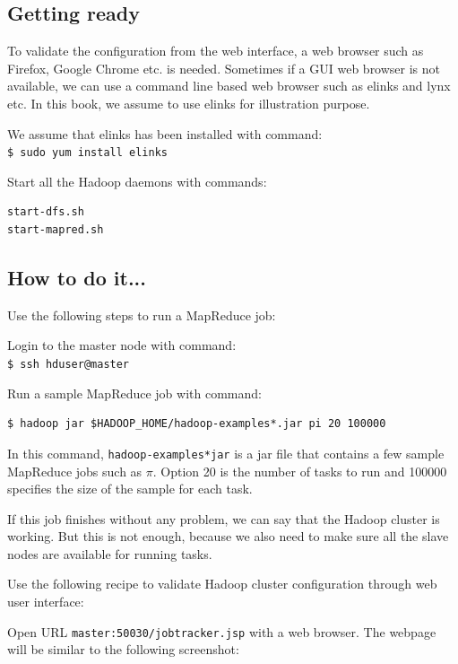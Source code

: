 \subsection*{Getting ready}
To validate the configuration from the web interface, a web browser such as Firefox, Google Chrome etc. is needed. Sometimes if a GUI web browser is not available, we can use a command line based web browser such as elinks and lynx etc. In this book, we assume to use elinks for illustration purpose.

We assume that elinks has been installed with command: \\
\verb|$ sudo yum install elinks|

Start all the Hadoop daemons with commands:
\lstset{style=bashstyle}
\begin{lstlisting}
start-dfs.sh
start-mapred.sh
\end{lstlisting}

\subsection*{How to do it...}
Use the following steps to run a MapReduce job:

Login to the master node with command: \\
\verb|$ ssh hduser@master|

Run a sample MapReduce job with command:
\lstset{style=bashstyle}
\begin{lstlisting}
$ hadoop jar $HADOOP_HOME/hadoop-examples*.jar pi 20 100000
\end{lstlisting}

In this command, \verb|hadoop-examples*jar| is a jar file that contains a few sample MapReduce jobs such as $\pi$. Option 20 is the number of tasks to run and 100000 specifies the size of the sample for each task.

If this job finishes without any problem, we can say that the Hadoop cluster is working. But this is not enough, because we also need to make sure all the slave nodes are available for running tasks.

Use the following recipe to validate Hadoop cluster configuration through web user interface:

Open URL \verb|master:50030/jobtracker.jsp| with a web browser.
The webpage will be similar to the following screenshot:

